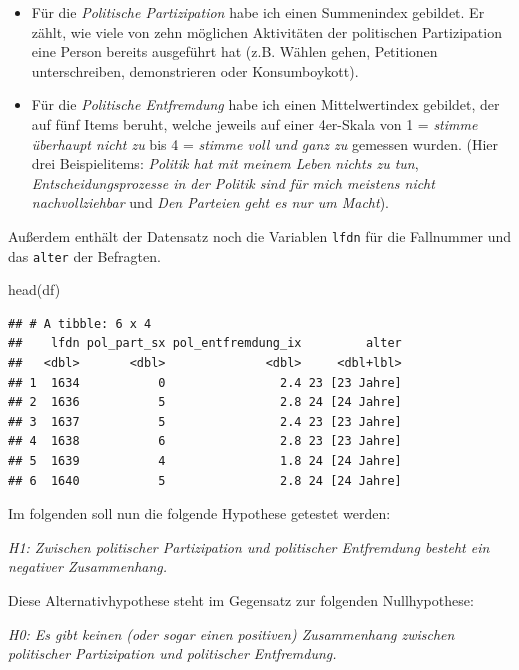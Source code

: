 \documentclass[
]{book}
\newenvironment{Shaded}{\begin{snugshade}}{\end{snugshade}}
\newcommand{\FunctionTok}[1]{\textcolor[rgb]{0.00,0.00,0.00}{#1}}
\newcommand{\NormalTok}[1]{#1}
\begin{document}
\begin{itemize}
\item
  Für die \emph{Politische Partizipation} habe ich einen Summenindex gebildet. Er zählt, wie viele von zehn möglichen Aktivitäten der politischen Partizipation eine Person bereits ausgeführt hat (z.B. Wählen gehen, Petitionen unterschreiben, demonstrieren oder Konsumboykott).
\item
  Für die \emph{Politische Entfremdung} habe ich einen Mittelwertindex gebildet, der auf fünf Items beruht, welche jeweils auf einer 4er-Skala von 1 = \emph{stimme überhaupt nicht zu} bis 4 = \emph{stimme voll und ganz zu} gemessen wurden. (Hier drei Beispielitems: \emph{Politik hat mit meinem Leben nichts zu tun}, \emph{Entscheidungsprozesse in der Politik sind für mich meistens nicht nachvollziehbar} und \emph{Den Parteien geht es nur um Macht}).
\end{itemize}

Außerdem enthält der Datensatz noch die Variablen \texttt{lfdn} für die Fallnummer und das \texttt{alter} der Befragten.

\begin{Shaded}
\begin{Highlighting}[]
\FunctionTok{head}\NormalTok{(df)}
\end{Highlighting}
\end{Shaded}

\begin{verbatim}
## # A tibble: 6 x 4
##    lfdn pol_part_sx pol_entfremdung_ix         alter
##   <dbl>       <dbl>              <dbl>     <dbl+lbl>
## 1  1634           0                2.4 23 [23 Jahre]
## 2  1636           5                2.8 24 [24 Jahre]
## 3  1637           5                2.4 23 [23 Jahre]
## 4  1638           6                2.8 23 [23 Jahre]
## 5  1639           4                1.8 24 [24 Jahre]
## 6  1640           5                2.8 24 [24 Jahre]
\end{verbatim}

Im folgenden soll nun die folgende Hypothese getestet werden:

\emph{H1: Zwischen politischer Partizipation und politischer Entfremdung besteht ein negativer Zusammenhang.}

Diese Alternativhypothese steht im Gegensatz zur folgenden Nullhypothese:

\emph{H0: Es gibt keinen (oder sogar einen positiven) Zusammenhang zwischen politischer Partizipation und politischer Entfremdung.}
\end{document}
